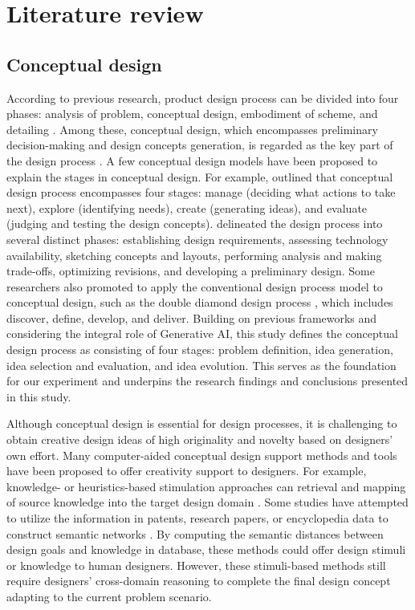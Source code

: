 \section{Literature review}
\subsection{Conceptual design}

According to previous research, product design process can be divided into four phases: analysis of problem, conceptual design, embodiment of scheme, and detailing \citep{french1985conceptual}. Among these, conceptual design, which encompasses preliminary decision-making and design concepts generation, is regarded as the key part of the design process \citep{eppinger1995product}. A few conceptual design models have been proposed to explain the stages in conceptual design. For example, \cite{goodman2016designing} outlined that conceptual design process encompasses four stages: manage (deciding what actions to take next), explore (identifying needs), create (generating ideas), and evaluate (judging and testing the design concepts). \cite{Jasmine2020} delineated the design process into several distinct phases: establishing design requirements, assessing technology availability, sketching concepts and layouts, performing analysis and making trade-offs, optimizing revisions, and developing a preliminary design. Some researchers also promoted to apply the conventional design process model to conceptual design, such as the double diamond design process \citep{DesignCouncil2019}, which includes discover, define, develop, and deliver. Building on previous frameworks and considering the integral role of Generative AI, this study defines the conceptual design process as consisting of four stages: problem definition, idea generation, idea selection and evaluation, and idea evolution. This serves as the foundation for our experiment and underpins the research findings and conclusions presented in this study.

Although conceptual design is essential for design processes, it is challenging to obtain creative design ideas of high originality and novelty based on designers' own effort. Many computer-aided conceptual design support methods and tools have been proposed to offer creativity support to designers. For example, knowledge- or heuristics-based stimulation approaches can retrieval and mapping of source knowledge into the target design domain \citep{jiang2022data}. Some studies have attempted to utilize the information in patents, research papers, or encyclopedia data to construct semantic networks \citep{luo2019computer, sarica2020technet}. By computing the semantic distances between design goals and knowledge in database, these methods could offer design stimuli or knowledge to human designers. However, these stimuli-based methods still require designers' cross-domain reasoning to complete the final design concept adapting to the current problem scenario.

